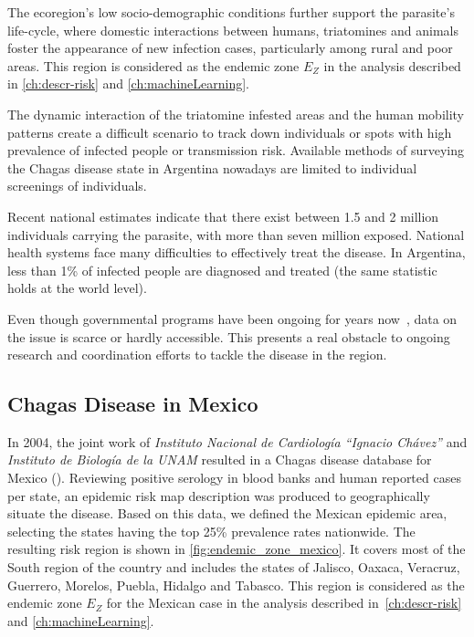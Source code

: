 The ecoregion's low socio-demographic conditions further support the parasite's life-cycle, where domestic interactions between humans, triatomines and animals foster the appearance of new infection cases, particularly among rural and poor areas.
This region is considered as the endemic zone $E_Z$ in the analysis described in \cref{ch:descr-risk} and \cref{ch:machineLearning}.



The dynamic interaction of the triatomine infested areas and the human mobility patterns create a difficult scenario to track down individuals or spots with high prevalence of infected people or transmission risk. 
Available methods of surveying the Chagas disease state in Argentina nowadays are limited to individual screenings of individuals.

Recent national estimates indicate that there exist between 1.5 and 2 million individuals carrying the parasite, with more than seven million exposed. National health systems face many difficulties to effectively treat the disease.
In Argentina, less than 1\% of infected people are diagnosed and treated
(the same statistic holds at the world level).

Even though governmental programs have been ongoing for years now~\cite{plan_nacional_chagas}, data on the issue is scarce or hardly accessible. 
This presents a real obstacle to ongoing research and coordination efforts to tackle the disease in the region.


\subsection{Chagas Disease in  Mexico}\label{endemic_zone_mexico}


In 2004, the joint work of \textit{Instituto Nacional de Cardiología ``Ignacio Chávez''} and  \textit{Instituto de Biología de la UNAM} resulted in a Chagas disease database for Mexico (\cite{cruz2006chagmex}). 
Reviewing positive serology in blood banks and human reported cases per state, an epidemic risk map description was produced to geographically situate the disease. 
Based on this data, we defined the Mexican epidemic area, selecting the states having the top 25\% prevalence rates nationwide. 
The resulting risk region is shown in \cref{fig:endemic_zone_mexico}. 
It covers most of the South region of the country and includes the states of Jalisco, Oaxaca, Veracruz, Guerrero, Morelos, Puebla, Hidalgo and Tabasco.
This region is considered as the endemic zone $E_Z$ for the Mexican case in the analysis described in~\cref{ch:descr-risk} and \cref{ch:machineLearning}.

